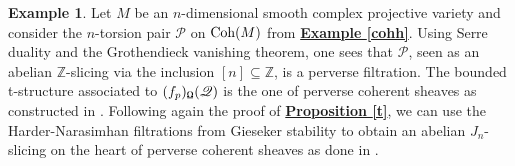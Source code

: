\documentclass{article}
\theoremstyle{definition}
\newtheorem{exmp}[thm]{Example}
\begin{document}
\begin{exmp}
Let $M$ be an $n$-dimensional smooth complex projective variety and consider the $n$-torsion pair $\mathscr{P}$ on $\textnormal{Coh}(M)$ from \hyperref[cohh]{\textbf{Example \ref*{cohh}}}. Using Serre duality and the Grothendieck vanishing theorem, one sees that $\mathscr{P}$, seen as an abelian $\mathbb{Z}$-slicing via the inclusion $[n] \subseteq \mathbb{Z}$, is a perverse filtration. The bounded t-structure associated to $(f_p)_{\textnormal{\Libra}}(\mathscr{Q})$ is the one of perverse coherent sheaves as constructed in \cite{bez}. Following again the proof of \hyperref[t]{\textbf{Proposition \ref*{t}}}, we can use the Harder-Narasimhan filtrations from Gieseker stability to obtain an abelian $J_n$-slicing on the heart of perverse coherent sheaves as done in \cite{perpol}. 
\end{exmp}
\end{document}
